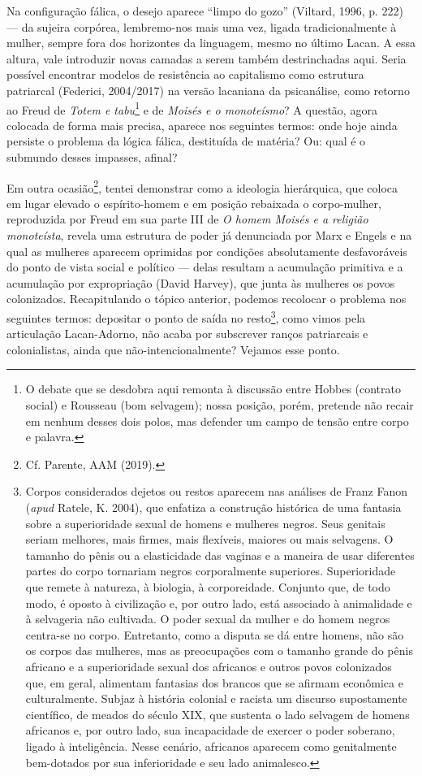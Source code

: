 Na configuração fálica, o desejo aparece ``limpo do gozo'' (Viltard,
1996, p. 222) --- da sujeira corpórea, lembremo-nos mais uma vez, ligada
tradicionalmente à mulher, sempre fora dos horizontes da linguagem,
mesmo no último Lacan. A essa altura, vale introduzir novas camadas a
serem também destrinchadas aqui. Seria possível encontrar modelos de
resistência ao capitalismo como estrutura patriarcal (Federici,
2004/2017) na versão lacaniana da psicanálise, como retorno ao Freud de
\emph{Totem e tabu}\footnote{O debate que se desdobra aqui remonta à
  discussão entre Hobbes (contrato social) e Rousseau (bom selvagem);
  nossa posição, porém, pretende não recair em nenhum desses dois polos,
  mas defender um campo de tensão entre corpo e palavra.} e de
\emph{Moisés e o monoteísmo}? A questão, agora colocada de forma mais
precisa, aparece nos seguintes termos: onde hoje ainda persiste o
problema da lógica fálica, destituída de matéria? Ou: qual é o submundo
desses impasses, afinal?

Em outra ocasião\footnote{Cf. Parente, AAM (2019).}, tentei demonstrar
como a ideologia hierárquica, que coloca em lugar elevado o
espírito-homem e em posição rebaixada o corpo-mulher, reproduzida por
Freud em sua parte III de \emph{O homem Moisés e a religião monoteísta},
revela uma estrutura de poder já denunciada por Marx e Engels e na qual
as mulheres aparecem oprimidas por condições absolutamente desfavoráveis
do ponto de vista social e político --- delas resultam a acumulação
primitiva e a acumulação por expropriação (David Harvey), que junta às
mulheres os povos colonizados. Recapitulando o tópico anterior, podemos
recolocar o problema nos seguintes termos: depositar o ponto de saída no
resto\footnote{Corpos considerados dejetos ou restos aparecem nas
  análises de Franz Fanon (\emph{apud} Ratele, K. 2004), que enfatiza a
  construção histórica de uma fantasia sobre a superioridade sexual de
  homens e mulheres negros. Seus genitais seriam melhores, mais firmes,
  mais flexíveis, maiores ou mais selvagens. O tamanho do pênis ou a
  elasticidade das vaginas e a maneira de usar diferentes partes do
  corpo tornariam negros corporalmente superiores. Superioridade que
  remete à natureza, à biologia, à corporeidade. Conjunto que, de todo
  modo, é oposto à civilização e, por outro lado, está associado à
  animalidade e à selvageria não cultivada. O poder sexual da mulher e
  do homem negros centra-se no corpo. Entretanto, como a disputa se dá
  entre homens, não são os corpos das mulheres, mas as preocupações com
  o tamanho grande do pênis africano e a superioridade sexual dos
  africanos e outros povos colonizados que, em geral, alimentam
  fantasias dos brancos que se afirmam econômica e culturalmente. Subjaz
  à história colonial e racista um discurso supostamente científico, de
  meados do século XIX, que sustenta o lado selvagem de homens africanos
  e, por outro lado, sua incapacidade de exercer o poder soberano,
  ligado à inteligência. Nesse cenário, africanos aparecem como
  genitalmente bem-dotados por sua inferioridade e seu lado animalesco.},
como vimos pela articulação Lacan-Adorno, não acaba por subscrever
ranços patriarcais e colonialistas, ainda que não-intencionalmente?
Vejamos esse ponto.

